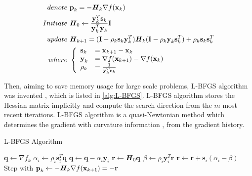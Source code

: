 \begin{align}
	denote   & \ \textbf{p}_k = -\textbf{\textit{H}}_k \nabla f(\textbf{x}_{k})  \label{eq:BFGS_calc_p_k}                                                                                             \\
	Initiate & \ \textbf{\textit{H}}_0     \leftarrow \frac{\textbf{y}_k^T\textbf{s}_k}{\textbf{y}_k^T\textbf{y}_k}\textbf{I}                                                                         \\
	update   & \ \textbf{\textit{H}}_{k+1}  = (\textbf{I} - \rho_k\textbf{s}_k\textbf{y}_k^T) \textbf{\textit{H}}_k (\textbf{I} - \rho_k\textbf{y}_k\textbf{s}_k^T) +\rho_k\textbf{s}_k\textbf{s}_k^T \\
	where    & \                        \left\{
	\begin{array}{ll}
		\textbf{s}_k & = \textbf{x}_{k+1} - \textbf{x}_{k}                               \\
		\textbf{y}_k & = \nabla f(\textbf{x}_{k+1}) - \nabla f(\textbf{x}_{k})           \\
		\rho_k       & = \frac{1}{\textbf{y}_k^T\textbf{s}_k} \label{eq:BFGS_calc_rho_k}
	\end{array}
	\right.
\end{align}

Then, aiming to save memory usage for large scale problems, L-BFGS algorithm was invented \cite{Liu1989}, which is listed in \cref{alg:L-BFGS}. L-BFGS algorithm stores the Hessian matrix implicitly and compute the search direction from the $m$ most recent iterations. L-BFGS algorithm is a quasi-Newtonian method which determines the gradient with curvature information \cite{Liu1989}, from the gradient history.

\begin{algorithm}[h!]
	\caption{L-BFGS Algorithm \cite{Liu1989}}\label{alg:L-BFGS}
	\begin{algorithmic}
		\State $\textbf{q} \gets \nabla f_k$
		\State $\alpha_i \gets \rho_i \textbf{s}_i^T \textbf{q}$
		\State $ \textbf{q} \gets \textbf{q} - \alpha_i\textbf{y}_i$
		\EndFor
		\State $\textbf{r}\gets \textbf{\textit{H}}_0 \textbf{q}$
		\State $\beta \gets \rho_i \textbf{y}_i^T \textbf{r}$
		\State $ \textbf{r} \gets \textbf{r} +\textbf{s}_i (\alpha_i-\beta)$
		\EndFor
		\State Step with $\textbf{p}_k \gets -\textbf{\textit{H}}_k \nabla f(\textbf{x}_{k+1}) = -\textbf{r}$
	\end{algorithmic}
\end{algorithm}

